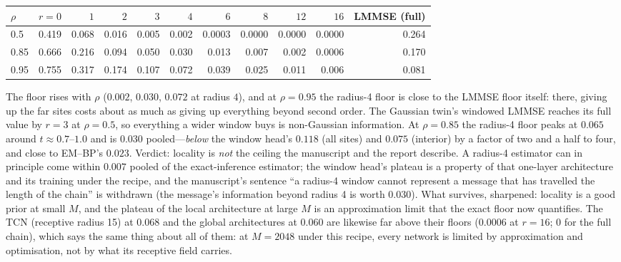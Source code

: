 \begin{center}\small
\begin{tabular}{@{}lrrrrrrrrrr@{}}
\toprule
$\rho$ & $r=0$ & $1$ & $2$ & $3$ & $4$ & $6$ & $8$ & $12$ & $16$ & LMMSE (full) \\
\midrule
0.5 & 0.419 & 0.068 & 0.016 & 0.005 & 0.002 & 0.0003 & 0.0000 & 0.0000 & 0.0000 & 0.264 \\
0.85 & 0.666 & 0.216 & 0.094 & 0.050 & 0.030 & 0.013 & 0.007 & 0.002 & 0.0006 & 0.170 \\
0.95 & 0.755 & 0.317 & 0.174 & 0.107 & 0.072 & 0.039 & 0.025 & 0.011 & 0.006 & 0.081 \\
\bottomrule
\end{tabular}
\end{center}
The floor rises with $\rho$ ($0.002$, $0.030$, $0.072$ at radius $4$), and at $\rho=0.95$ the radius-4 floor is close to the LMMSE floor itself: there, giving up the far sites costs about as much as giving up everything beyond second order. The Gaussian twin's windowed LMMSE reaches its full value by $r=3$ at $\rho=0.5$, so everything a wider window buys is non-Gaussian information. At $\rho=0.85$ the radius-4 floor peaks at $0.065$ around $t\approx0.7$--$1.0$ and is $0.030$ pooled---\emph{below} the window head's $0.118$ (all sites) and $0.075$ (interior) by a factor of two and a half to four, and close to EM--BP's $0.023$. Verdict: locality is \emph{not} the ceiling the manuscript and the report describe. A radius-4 estimator can in principle come within $0.007$ pooled of the exact-inference estimator; the window head's plateau is a property of that one-layer architecture and its training under the recipe, and the manuscript's sentence ``a radius-4 window cannot represent a message that has travelled the length of the chain'' is withdrawn (the message's information beyond radius 4 is worth $0.030$). What survives, sharpened: locality is a good prior at small $M$, and the plateau of the local architecture at large $M$ is an approximation limit that the exact floor now quantifies. The TCN (receptive radius 15) at $0.068$ and the global architectures at $0.060$ are likewise far above their floors ($0.0006$ at $r=16$; $0$ for the full chain), which says the same thing about all of them: at $M=2048$ under this recipe, every network is limited by approximation and optimisation, not by what its receptive field carries.

